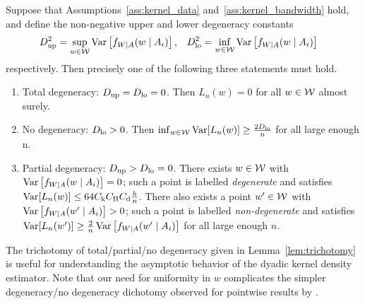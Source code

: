 \begin{lemma}
  \label{lem:trichotomy}

  Suppose that Assumptions~\ref{ass:kernel_data}
  and~\ref{ass:kernel_bandwidth} hold,
  and define the non-negative
  upper and lower degeneracy constants
  \begin{align*}
    D_{\textup{up}}^2
    &=
    \sup_{w \in \mathcal{W}}
    \operatorname{Var}\left[
      f_{W \mid A}(w \mid A_i)
    \right],
    &D_{\textup{lo}}^2
    &=
    \inf_{w \in \mathcal{W}}
    \operatorname{Var}\left[
      f_{W \mid A}(w \mid A_i)
    \right]
  \end{align*}
  respectively.
  Then precisely one of the following three statements must hold.
  \begin{enumerate}[label=(\roman*)]

    \item Total degeneracy:
      $D_{\textup{up}} = D_{\textup{lo}} = 0$.
      Then
      $L_n(w) = 0$ for all $w \in \mathcal{W}$
      almost surely.

    \item No degeneracy:
      $D_{\textup{lo}} > 0$. Then
      $\inf_{w \in \mathcal{W}} \operatorname{Var}[L_n(w)] \geq \frac{2 D_{\textup{lo}}}{n}$
      for all large enough n.

    \item Partial degeneracy:
      $D_{\textup{up}} > D_{\textup{lo}} = 0$.
      There exists $w \in \mathcal{W}$ with
      $\operatorname{Var}\left[f_{W \mid A}(w \mid A_i)\right] = 0$;
      such a point is labelled \emph{degenerate} and satisfies
      $\operatorname{Var}[L_n(w)] \leq 64 C_\mathrm{k} C_\mathrm{H} C_\mathrm{d} \frac{h}{n}$.
      There also exists a point $w' \in \mathcal{W}$ with
      $\operatorname{Var}\left[f_{W \mid A}(w' \mid A_i)\right] > 0$;
      such a point is labelled \emph{non-degenerate} and satisfies
      $\operatorname{Var}[L_n(w')] \geq
      \frac{2}{n} \operatorname{Var}\left[f_{W \mid A}(w' \mid A_i)\right]$
      for all large enough $n$.

  \end{enumerate}

\end{lemma}

\begin{remark}

  The trichotomy of total/partial/no degeneracy
  given in Lemma~\ref{lem:trichotomy} is useful for understanding
  the asymptotic behavior of the dyadic kernel density estimator.
  Note that our need for uniformity in $w$
  complicates the simpler degeneracy/no degeneracy
  dichotomy observed for pointwise results by
  \citet{graham2022kernel}.

\end{remark}

